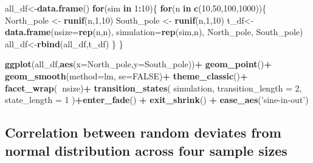 \documentclass[]{book}
\newenvironment{Shaded}{\begin{snugshade}}{\end{snugshade}}
\newcommand{\ControlFlowTok}[1]{\textcolor[rgb]{0.13,0.29,0.53}{\textbf{#1}}}
\newcommand{\DataTypeTok}[1]{\textcolor[rgb]{0.13,0.29,0.53}{#1}}
\newcommand{\DecValTok}[1]{\textcolor[rgb]{0.00,0.00,0.81}{#1}}
\newcommand{\KeywordTok}[1]{\textcolor[rgb]{0.13,0.29,0.53}{\textbf{#1}}}
\newcommand{\NormalTok}[1]{#1}
\newcommand{\OperatorTok}[1]{\textcolor[rgb]{0.81,0.36,0.00}{\textbf{#1}}}
\newcommand{\OtherTok}[1]{\textcolor[rgb]{0.56,0.35,0.01}{#1}}
\newcommand{\StringTok}[1]{\textcolor[rgb]{0.31,0.60,0.02}{#1}}
\begin{document}
\begin{Shaded}
\begin{Highlighting}[]
\NormalTok{all_df<-}\KeywordTok{data.frame}\NormalTok{()}
\ControlFlowTok{for}\NormalTok{(sim }\ControlFlowTok{in} \DecValTok{1}\OperatorTok{:}\DecValTok{10}\NormalTok{)\{}
  \ControlFlowTok{for}\NormalTok{(n }\ControlFlowTok{in} \KeywordTok{c}\NormalTok{(}\DecValTok{10}\NormalTok{,}\DecValTok{50}\NormalTok{,}\DecValTok{100}\NormalTok{,}\DecValTok{1000}\NormalTok{))\{}
\NormalTok{  North_pole <-}\StringTok{ }\KeywordTok{runif}\NormalTok{(n,}\DecValTok{1}\NormalTok{,}\DecValTok{10}\NormalTok{)}
\NormalTok{  South_pole <-}\StringTok{ }\KeywordTok{runif}\NormalTok{(n,}\DecValTok{1}\NormalTok{,}\DecValTok{10}\NormalTok{)}
\NormalTok{  t_df<-}\KeywordTok{data.frame}\NormalTok{(}\DataTypeTok{nsize=}\KeywordTok{rep}\NormalTok{(n,n),}
                   \DataTypeTok{simulation=}\KeywordTok{rep}\NormalTok{(sim,n),}
\NormalTok{                                  North_pole,}
\NormalTok{                                  South_pole)}
\NormalTok{  all_df<-}\KeywordTok{rbind}\NormalTok{(all_df,t_df)}
\NormalTok{  \}}
\NormalTok{\}}


\KeywordTok{ggplot}\NormalTok{(all_df,}\KeywordTok{aes}\NormalTok{(}\DataTypeTok{x=}\NormalTok{North_pole,}\DataTypeTok{y=}\NormalTok{South_pole))}\OperatorTok{+}
\StringTok{  }\KeywordTok{geom_point}\NormalTok{()}\OperatorTok{+}
\StringTok{  }\KeywordTok{geom_smooth}\NormalTok{(}\DataTypeTok{method=}\NormalTok{lm, }\DataTypeTok{se=}\OtherTok{FALSE}\NormalTok{)}\OperatorTok{+}
\StringTok{  }\KeywordTok{theme_classic}\NormalTok{()}\OperatorTok{+}
\StringTok{  }\KeywordTok{facet_wrap}\NormalTok{(}\OperatorTok{~}\NormalTok{nsize)}\OperatorTok{+}
\StringTok{  }\KeywordTok{transition_states}\NormalTok{(}
\NormalTok{    simulation,}
    \DataTypeTok{transition_length =} \DecValTok{2}\NormalTok{,}
    \DataTypeTok{state_length =} \DecValTok{1}
\NormalTok{  )}\OperatorTok{+}\KeywordTok{enter_fade}\NormalTok{() }\OperatorTok{+}\StringTok{ }
\StringTok{  }\KeywordTok{exit_shrink}\NormalTok{() }\OperatorTok{+}
\StringTok{  }\KeywordTok{ease_aes}\NormalTok{(}\StringTok{'sine-in-out'}\NormalTok{)}
\end{Highlighting}
\end{Shaded}

\hypertarget{correlation-between-random-deviates-from-normal-distribution-across-four-sample-sizes}{%
\subsection{Correlation between random deviates from normal distribution across four sample sizes}\label{correlation-between-random-deviates-from-normal-distribution-across-four-sample-sizes}}
\end{document}
